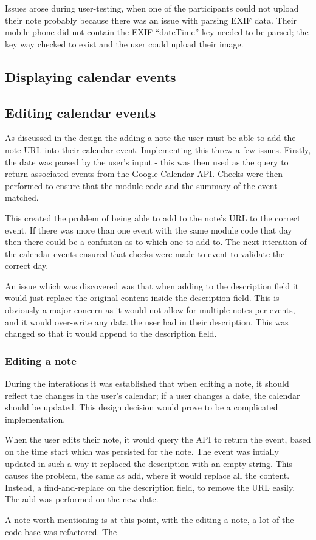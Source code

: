 Issues arose during user-testing, when one of the participants could not upload their note probably because there was an issue with parsing EXIF data. Their mobile phone did not contain the EXIF ``dateTime'' key needed to be parsed; the key way checked to exist and the user could upload their image.

\subsection{Displaying calendar events}


\subsection{Editing calendar events}
As discussed in the design the adding a note the user must be able to add the note URL into their calendar event. Implementing this threw a few issues. Firstly, the date was parsed by the user's input - this was then used as the query to return associated events from the Google Calendar API. Checks were then performed to ensure that the module code and the summary of the event matched.

This created the problem of being able to add to the note's URL to the correct event. If there was more than one event with the same module code that day then there could be a confusion as to which one to add to. The next itteration of the calendar events ensured that checks were made to event to validate the correct day.

An issue which was discovered was that when adding to the description field it would just replace the original content inside the description field. This is obviously a major concern as it would not allow for multiple notes per events, and it would over-write any data the user had in their description. This was changed so that it would append to the description field.

\subsubsection{Editing a note}
During the interations it was established that when editing a note, it should reflect the changes in the user's calendar; if a user changes a date, the calendar should be updated. This design decision would prove to be a complicated implementation.

When the user edits their note, it would query the API to return the event, based on the time start which was persisted for the note. The event was intially updated in such a way it replaced the description with an empty string. This causes the problem, the same as add, where it would replace all the content. Instead, a find-and-replace on the description field, to remove the URL easily. The add was performed on the new date.

A note worth mentioning is at this point, with the editing a note, a lot of the code-base was refactored. The 
